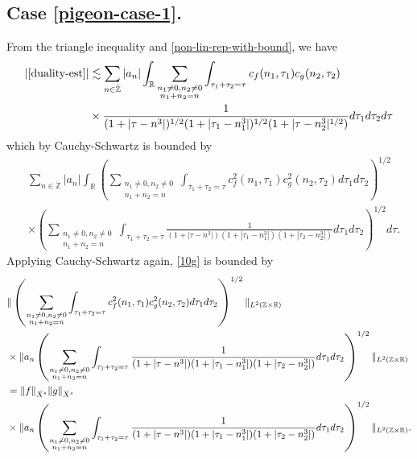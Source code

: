 \documentclass[12pt,reqno]{amsart}
\numberwithin{equation}{section}  %
\numberwithin{figure}{section}
\newcommand{\rr}{\mathbb{R}}
\newcommand{\zz}{\mathbb{Z}}
\newcommand{\zzdot}{\dot{\zz}}
\theoremstyle{plain}
\theoremstyle{definition}
\theoremstyle{remark}
\begin{document}
\subsection{Case \eqref{pigeon-case-1}.} From the triangle inequality and \eqref{non-lin-rep-with-bound}, we have
%
%
\begin{equation*}
	\begin{split}
	 |\eqref{duality-est}|
	& \lesssim \sum_{n \in \zzdot} |a_{n}| \int_{\rr} \sum_{\substack{n_1 \neq 0, n_2 \neq 0
		\\ n_1 +n_2 =n}} \int_{\tau_1 + \tau_2 = \tau} c_f(n_1, \tau_1)
		c_g(n_2, \tau_2)
		\\
		& \times \frac{1}{(1 + | \tau - n^{3} |)^{1/2}(1 + |
		\tau_{1}-n_{1}^{3} |)^{1/2}(1 + | \tau-n_{2}^{3} |^{1/2})} d \tau_1 d \tau_2
		d \tau
	\end{split}
\end{equation*}
%
%
which by Cauchy-Schwartz is bounded by
%
%
\begin{equation}
	\label{10g}
	\begin{split}
		& \sum_{n \in \zzdot} |a_n| \int_{\rr} \left(  \sum_{\substack{n_1 \neq 0, n_2
		\neq 0 \\n_1 +n_2 =n}} \int_{\tau_1 + \tau_2 = \tau} c_{f}^{2}(n_1, \tau_1)
		c_{g}^{2} (n_2, \tau_2) d \tau_1 d \tau_2 \right)^{1/2} 
		\\
		& \times \left( \sum_{\substack{n_1 \neq 0, n_2 \neq 0 \\n_1 +n_2 =n}}
		\int_{\tau_1 + \tau_2 = \tau} \frac{1}{(1 + | \tau - n^{3} |)(1 + | \tau_{1}-n_{1}^{3} |)(1 + |
		\tau_2 -n_{2}^{3} |)} d \tau_1 d \tau_2
		\right)^{1/2} d \tau.
	\end{split}
\end{equation}
%
%
Applying Cauchy-Schwartz again, \eqref{10g} is bounded by
%
%
\begin{align}
	\notag
		& \|\left( \sum_{\substack{n_1 \neq 0, n_2 \neq 0 \\n_1 +n_2 =n}}\int_{\tau_1 + \tau_2 = \tau} c_{f}^{2}(n_1, \tau_1)
		c_{g}^{2} (n_2, \tau_2) d \tau_1 d \tau_2 \right)^{1/2} \|_{L^{2}(\zz \times
		\rr)}
		\\
		\notag
		& \times  \|a_{n}
		\left( \sum_{\substack{n_1 \neq 0, n_2 \neq 0 \\n_1 +n_2
		=n}}\int_{\tau_1 + \tau_2 = \tau} \frac{1}{ (1 + | \tau - n^{3} |)(1 + |
		\tau_{1}-n_{1}^{3} |)(1 + | \tau_2 -n_{2}^{3} |)} d \tau_1 d \tau_2
		\right)^{1/2} \|_{L^2(\zz \times \rr)}
		\\
		\notag
		& = \|f\|_{\dot{X}^s} \|g\|_{\dot{X}^s}
		\\
		\label{holder-term}
		& \times 
		\|a_{n}
		\left( \sum_{\substack{n_1 \neq 0, n_2 \neq 0 \\n_1 +n_2
		=n}}\int_{\tau_1 + \tau_2 = \tau} \frac{1}{ (1 + | \tau - n^{3} |)(1 + |
		\tau_{1}-n_{1}^{3} |)(1 + | \tau_2 -n_{2}^{3} |)} d \tau_1 d \tau_2
		\right)^{1/2} \|_{L^2(\zz \times \rr)}.
\end{align}
\end{document}

